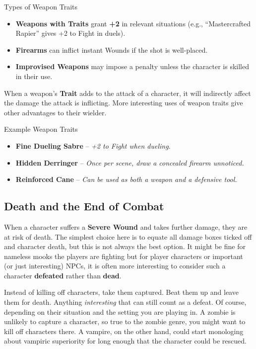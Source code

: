 \begin{DndReadAloud}{Types of Weapon Traits}
\begin{itemize}
    \item \textbf{Weapons with Traits} grant \textbf{+2} in relevant situations (e.g., “Mastercrafted Rapier” gives +2 to Fight in duels).
    \item \textbf{Firearms} can inflict instant Wounds if the shot is well-placed.
    \item \textbf{Improvised Weapons} may impose a penalty unless the character is skilled in their use.
\end{itemize}
\end{DndReadAloud}

When a weapon's \textbf{Trait} adds to the attack of a character, it will indirectly affect the damage the attack is inflicting. More interesting uses of weapon traits give other advantages to their wielder.

\begin{DndReadAloud}{Example Weapon Traits}
\begin{itemize}
    \item \textbf{Fine Dueling Sabre} – \textit{+2 to Fight when dueling.}
    \item \textbf{Hidden Derringer} – \textit{Once per scene, draw a concealed firearm unnoticed.}
    \item \textbf{Reinforced Cane} – \textit{Can be used as both a weapon and a defensive tool.}
\end{itemize}
\end{DndReadAloud}

\subsection{Death and the End of Combat}\label{core:death}
When a character suffers a \textbf{Severe Wound} and takes further damage, they are at risk of death. The simplest choice here is to equate all damage boxes ticked off and character death, but this is not always the best option. It might be fine for nameless mooks the players are fighting but for player characters or important (or just interesting) NPCs, it is often more interesting to consider such a character \textbf{defeated} rather than \textbf{dead}.

Instead of killing off characters, take them captured. Beat them up and leave them for death. Anything \emph{interesting} that can still count as a defeat. Of course, depending on their situation and the setting you are playing in. A zombie is unlikely to capture a character, so true to the zombie genre, you might want to kill off characters there. A vampire, on the other hand, could start monologing about vampiric superiority for long enough that the character could be rescued. 

